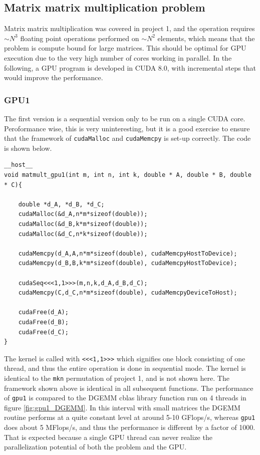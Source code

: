 \subsection{Matrix matrix multiplication problem}
Matrix matrix multiplication was covered in project 1, and the operation requires $\sim N^3$ floating point operations performed on $\sim N^2$ elements, which means that the problem is compute bound for large matrices. This should be optimal for GPU execution due to the very high number of cores working in parallel. In the following, a GPU program is developed in CUDA 8.0, with incremental steps that would improve the performance.
\subsubsection{GPU1}
The first version is a sequential version only to be run on a single CUDA core. Peroformance wise, this is very uninteresting, but it is a good exercise to ensure that the framework of \texttt{cudaMalloc} and \texttt{cudaMemcpy} is set-up correctly. The code is shown below.

\begin{lstlisting}[caption = gpu1 function with the cuda framework. The kernel \texttt{cudaSeq} is identical to the mkn permutaion from project 1.]
__host__
void matmult_gpu1(int m, int n, int k, double * A, double * B, double * C){

	double *d_A, *d_B, *d_C;
	cudaMalloc(&d_A,n*m*sizeof(double));
	cudaMalloc(&d_B,k*m*sizeof(double));
	cudaMalloc(&d_C,n*k*sizeof(double));

 	cudaMemcpy(d_A,A,n*m*sizeof(double), cudaMemcpyHostToDevice);
 	cudaMemcpy(d_B,B,k*m*sizeof(double), cudaMemcpyHostToDevice);
	
	cudaSeq<<<1,1>>>(m,n,k,d_A,d_B,d_C);
	cudaMemcpy(C,d_C,n*m*sizeof(double), cudaMemcpyDeviceToHost);

	cudaFree(d_A);
	cudaFree(d_B);
	cudaFree(d_C);
}
\end{lstlisting}
The kernel is called with \texttt{<<<1,1>>>} which signifies one block consisting of one thread, and thus the entire operation is done in sequential mode. The kernel is identical to the \texttt{mkn} permutation of project 1, and is not shown here. The framework shown above is identical in all subsequent functions. The performance of \texttt{gpu1} is compared to the DGEMM cblas library function run on 4 threads in figure \ref{fig:gpu1_DGEMM}. In this interval with small matrices the DGEMM routine performs at a quite constant level at around 5-10 GFlops/s, whereas \texttt{gpu1} does about 5 MFlops/s, and thus the performance is different by a factor of 1000. That is expected because a single GPU thread can never realize the parallelization potential of both the problem and the GPU.

